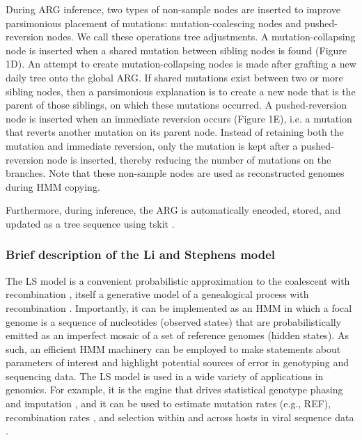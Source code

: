 \documentclass{article}
\begin{document}
During ARG inference, two types of non-sample nodes are inserted to improve
parsimonious placement of mutations: mutation-coalescing nodes and
pushed-reversion nodes. We call these operations tree adjustments. A
mutation-collapsing node is inserted when a shared mutation between sibling
nodes is found (Figure 1D). An attempt to create mutation-collapsing nodes is
made after grafting a new daily tree onto the global ARG. If shared mutations
exist between two or more sibling nodes, then a parsimonious explanation is to
create a new node that is the parent of those siblings, on which these
mutations occurred. A pushed-reversion node is inserted when an immediate
reversion occurs (Figure 1E), i.e. a mutation that reverts another mutation on
its parent node. Instead of retaining both the mutation and immediate
reversion, only the mutation is kept after a pushed-reversion node is inserted,
thereby reducing the number of mutations on the branches. Note that these
non-sample nodes are used as reconstructed genomes during HMM copying.

Furthermore, during inference, the ARG is automatically encoded, stored, and
updated as a tree sequence using tskit \citep{Kelleher2018-xc}.

\subsubsection{Brief description of the Li and Stephens model}

The LS model is a convenient probabilistic approximation to the coalescent with
recombination \citep{Hudson1983-if}, itself a generative model of a genealogical
process with recombination \citep{Li2003-ib}. Importantly, it can be implemented
as an HMM in which a focal genome is a sequence of nucleotides (observed
states) that are probabilistically emitted as an imperfect mosaic of a set of
reference genomes (hidden states). As such, an efficient HMM machinery can be
employed to make statements about parameters of interest and highlight
potential sources of error in genotyping and sequencing data. The LS model is
used in a wide variety of applications in genomics. For example, it is the
engine that drives statistical genotype phasing and imputation
\citep{Delaneau2019-wl,Browning2021-cg,Browning2018-nk,Rubinacci2020-pa}, and it
can be used to estimate mutation rates (e.g., REF), recombination rates
\citep[e.g.][]{Hinch2011-tz}, and selection within and across hosts in viral sequence
data \citep[e.g.][]{Palmer2019-wa}.
\end{document}
